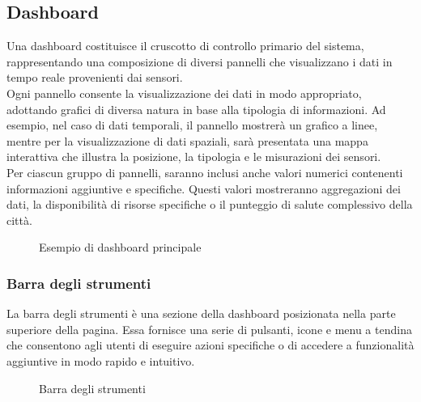 \subsection{Dashboard}
Una dashboard costituisce il cruscotto di controllo primario del sistema, rappresentando una composizione di diversi pannelli che visualizzano i dati in tempo reale provenienti dai sensori.\\
Ogni pannello consente la visualizzazione dei dati in modo appropriato, adottando grafici di diversa natura in base alla tipologia di informazioni. Ad esempio, nel caso di dati temporali, il pannello mostrerà un grafico a linee, mentre per la visualizzazione di dati spaziali, sarà presentata una mappa interattiva che illustra la posizione, la tipologia e le misurazioni dei sensori.\\
Per ciascun gruppo di pannelli, saranno inclusi anche valori numerici contenenti informazioni aggiuntive e specifiche. Questi valori mostreranno aggregazioni dei dati, la disponibilità di risorse specifiche o il punteggio di salute complessivo della città.\\
\begin{figure}[H]
    \centering
    \caption{Esempio di dashboard principale}
    \label{fig:my_label}
\end{figure}


\subsubsection{Barra degli strumenti}
La barra degli strumenti è una sezione della dashboard posizionata nella parte superiore della pagina. Essa fornisce una serie di pulsanti, icone e menu a tendina che consentono agli utenti di eseguire azioni specifiche o di accedere a funzionalità aggiuntive in modo rapido e intuitivo.\\
\begin{figure}[H]
    \centering
    \caption{Barra degli strumenti}
    \label{fig:my_label}
\end{figure}

